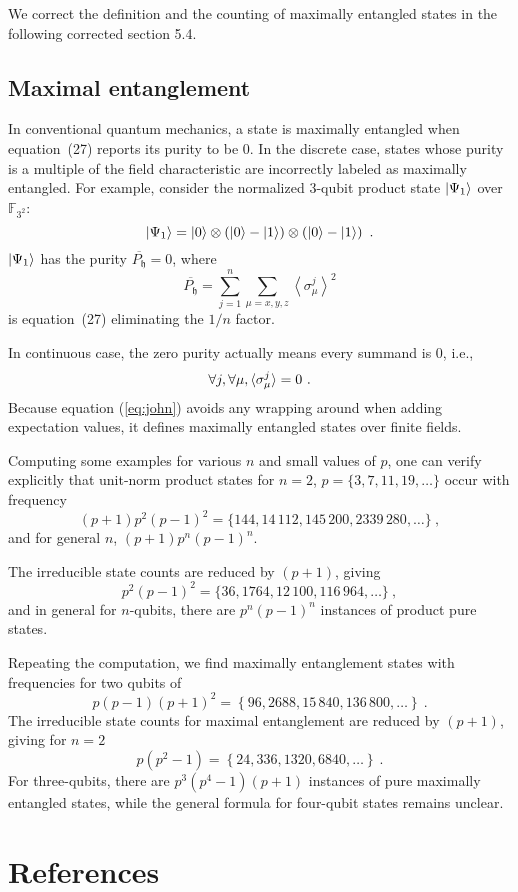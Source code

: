 \documentclass{iopart}
\newcommand{\ff}[1]{\mathbb{F}_{#1}}
\def\fh{\mathfrak{h}}
\begin{document}
We correct the definition and the counting of maximally entangled
states in the following corrected section 5.4.


\subsection{Maximal entanglement}

In conventional quantum mechanics, a state is maximally entangled
when equation~(27) reports its purity to be 0. In the discrete case,
states whose purity is a multiple of the field characteristic are
incorrectly labeled as maximally entangled. For example, consider
the normalized 3-qubit product state $\ket{\Psi_{1}}$ over $\ff{3^{2}}$:
\[
\ket{\Psi_{1}}=\ket{0}\otimes\left(\ket{0}-\ket{1}\right)\otimes\left(\ket{0}-\ket{1}\right)\textrm{ .}
\]
$\ket{\Psi_{1}}$ has the purity $\overline{P_{\fh}}=0$, where 
\[
\overline{P_{\fh}}=\sum_{j=1}^{n}\sum_{\mu=x,y,z}\left\langle \sigma_{\mu}^{j}\right\rangle ^{2}
\]
is equation~(27) eliminating the $1/n$ factor.


In continuous case, the zero purity actually means every summand is
$0$, i.e., 
\begin{equation}
\forall j,\forall\mu,\braket{\sigma_{\mu}^{j}}=0\textrm{ .}\label{eq:john}
\end{equation}
Because equation (\ref{eq:john}) avoids any wrapping around when
adding expectation values, it defines maximally entangled states over
finite fields.


Computing some examples for various $n$ and small values of $p$,
one can verify explicitly that unit-norm product states for $n=2$,
$p=\{3,7,11,19,\ldots\}$ occur with frequency 
\[
(p+1)p^{2}(p-1)^{2}=\{144,14\,112,145\,200,2339\,280,\ldots\}\ ,
\]
and for general $n$, $(p+1)p^{n}(p-1)^{n}$.

The irreducible state counts are reduced by $(p+1)$, giving 
\[
p^{2}(p-1)^{2}=\{36,1764,12\,100,116\,964,\ldots\}\ ,
\]
and in general for $n$-qubits, there are $p^{n}\left(p-1\right)^{n}$
instances of product pure states.

Repeating the computation, we find maximally entanglement states with
frequencies for two qubits of 
\[
p\left(p-1\right)\left(p+1\right)^{2}=\left\{ 96,2688,15\,840,136\,800,\ldots\right\} \ .
\]
The irreducible state counts for maximal entanglement are reduced
by $\left(p+1\right)$, giving for $n=2$ 
\[
p\left(p^{2}-1\right)=\left\{ 24,336,1320,6840,\ldots\right\} \ .
\]
For three-qubits, there are $p^{3}\left(p^{4}-1\right)\left(p+1\right)$
instances of pure maximally entangled states, while the general formula
for four-qubit states remains unclear.



\section*{References}

{}



\end{document}
